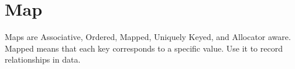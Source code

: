 \section{Map}
Maps are Associative, Ordered, Mapped, Uniquely Keyed, and Allocator aware\cite{cplusplus}.
Mapped means that each key corresponds to a specific value. Use it to record relationships in data.
